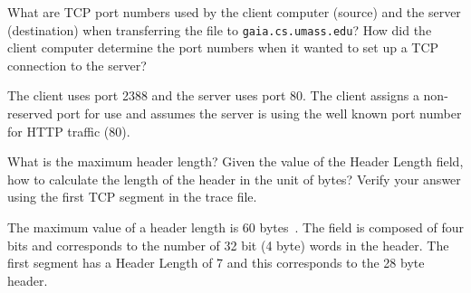 \begin{Question}
	What are TCP port numbers used by the client computer (source) and the server (destination) when transferring the file to \texttt{gaia.cs.umass.edu}? How did the client computer determine the port numbers when it wanted to set up a TCP connection to the server?
\end{Question}
\begin{Answer}
	The client uses port 2388 and the server uses port 80.
	The client assigns a non-reserved port for use and assumes the server is using the well known port number for HTTP traffic (80).
\end{Answer}

\begin{Question}
	What is the maximum header length? Given the value of the Header Length field, how to calculate the length of the header in the unit of bytes? Verify your answer using the first TCP segment in the trace file.
\end{Question}
\begin{Answer}
	The maximum value of a header length is 60 bytes~\cite{wiki-tcp}.
	The field is composed of four bits and corresponds to the number of 32 bit (4 byte) words in the header.
	The first segment has a Header Length of 7 and this corresponds to the 28 byte header.
\end{Answer}

